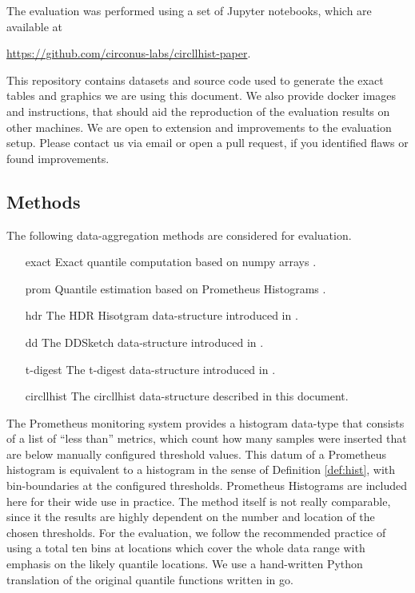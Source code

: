 \documentclass{article}
\theoremstyle{plain}
\theoremstyle{remark}
\begin{document}
The evaluation was performed using a set of Jupyter notebooks, which are available at
\begin{center}
  \url{https://github.com/circonus-labs/circllhist-paper}.
\end{center}
This repository contains datasets and source code used to generate the exact tables and graphics we
are using this document.  We also provide docker images and instructions, that should aid the
reproduction of the evaluation results on other machines.  We are open to extension and improvements
to the evaluation setup. Please contact us via email or open a pull request, if you identified flaws
or found improvements.

\subsection{Methods}

The following data-aggregation methods are considered for evaluation.

\begin{itemize}
\setlength{\itemindent}{2em}
\item[exact] Exact quantile computation based on numpy arrays \cite{numpy}.
\item[prom] Quantile estimation based on Prometheus Histograms \cite{prom}.
\item[hdr] The HDR Hisotgram data-structure introduced in \cite{hdr}.
\item[dd] The DDSketch data-structure introduced in \cite{dd}.
\item[t-digest] The t-digest data-structure introduced in \cite{tdigest}.
\item[circllhist] The circllhist data-structure described in this document.
\end{itemize}

The Prometheus monitoring system provides a histogram data-type that consists of a list of ``less
than'' metrics, which count how many samples were inserted that are below manually configured
threshold values. This datum of a Prometheus histogram is equivalent to a histogram in the sense of
Definition \ref{def:hist}, with bin-boundaries at the configured thresholds.  Prometheus Histograms
are included here for their wide use in practice.  The method itself is not really comparable, since
it the results are highly dependent on the number and location of the chosen thresholds. For the
evaluation, we follow the recommended practice of using a total ten bins at locations which cover
the whole data range with emphasis on the likely quantile locations.  We use a hand-written Python
translation of the original quantile functions written in go.
\end{document}
